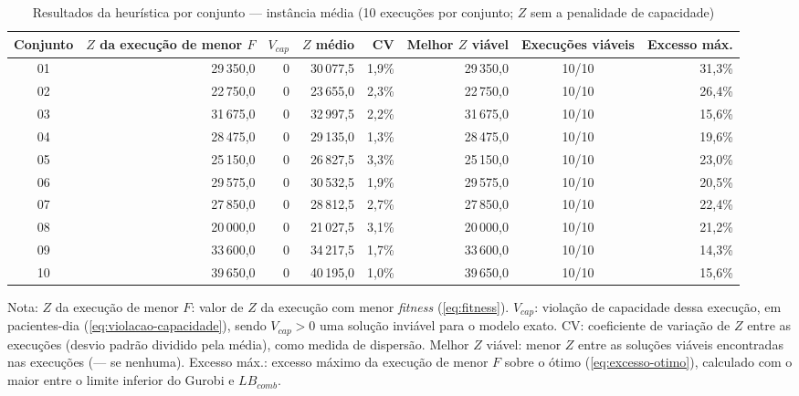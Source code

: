 \begin{table}[htbp]
    \caption{Resultados da heurística por conjunto --- instância média (10 execuções por conjunto; $Z$ sem a penalidade de capacidade)}
    \label{tab:res-z-medio}
    \centering
    \begin{adjustbox}{max width=\textwidth}
    \begin{tabular}{crrrrrcr}
        \hline
        \textbf{Conjunto} & \textbf{$Z$ da execução de menor $F$} & \textbf{$V_{cap}$} & \textbf{$Z$ médio} & \textbf{CV} & \textbf{Melhor $Z$ viável} & \textbf{Execuções viáveis} & \textbf{Excesso máx.} \\
        \hline
        01 & 29\,350,0 & 0 & 30\,077,5 & 1,9\% & 29\,350,0 & 10/10 & 31,3\% \\
        02 & 22\,750,0 & 0 & 23\,655,0 & 2,3\% & 22\,750,0 & 10/10 & 26,4\% \\
        03 & 31\,675,0 & 0 & 32\,997,5 & 2,2\% & 31\,675,0 & 10/10 & 15,6\% \\
        04 & 28\,475,0 & 0 & 29\,135,0 & 1,3\% & 28\,475,0 & 10/10 & 19,6\% \\
        05 & 25\,150,0 & 0 & 26\,827,5 & 3,3\% & 25\,150,0 & 10/10 & 23,0\% \\
        06 & 29\,575,0 & 0 & 30\,532,5 & 1,9\% & 29\,575,0 & 10/10 & 20,5\% \\
        07 & 27\,850,0 & 0 & 28\,812,5 & 2,7\% & 27\,850,0 & 10/10 & 22,4\% \\
        08 & 20\,000,0 & 0 & 21\,027,5 & 3,1\% & 20\,000,0 & 10/10 & 21,2\% \\
        09 & 33\,600,0 & 0 & 34\,217,5 & 1,7\% & 33\,600,0 & 10/10 & 14,3\% \\
        10 & 39\,650,0 & 0 & 40\,195,0 & 1,0\% & 39\,650,0 & 10/10 & 15,6\% \\
        \hline
    \end{tabular}
    \end{adjustbox}
    \par\smallskip
    {\footnotesize Nota: $Z$ da execução de menor $F$: valor de $Z$ da execução com menor \textit{fitness} (\autoref{eq:fitness}). $V_{cap}$: violação de capacidade dessa execução, em pacientes-dia (\autoref{eq:violacao-capacidade}), sendo $V_{cap} > 0$ uma solução inviável para o modelo exato. CV: coeficiente de variação de $Z$ entre as execuções (desvio padrão dividido pela média), como medida de dispersão. Melhor $Z$ viável: menor $Z$ entre as soluções viáveis encontradas nas execuções (--- se nenhuma). Excesso máx.: excesso máximo da execução de menor $F$ sobre o ótimo (\autoref{eq:excesso-otimo}), calculado com o maior entre o limite inferior do Gurobi e $LB_{comb}$.}
\end{table}
